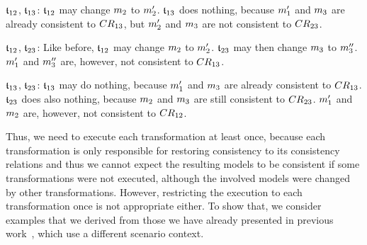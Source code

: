 \begin{properdescription}
    \item[$\transformation{t}_{12}$, $\transformation{t}_{13}$:] 
    $\transformation{t}_{12}$ may change $\model{m}{2}$ to $\model{m}{2}'$. $\transformation{t}_{13}$ does nothing, because $\model{m}{1}'$ and $\model{m}{3}$ are already consistent to $\consistencyrelation{CR}{13}$, but $\model{m}{2}'$ and $\model{m}{3}$ are not consistent to $\consistencyrelation{CR}{23}$.
    \item[$\transformation{t}_{12}$, $\transformation{t}_{23}$:] 
    Like before, $\transformation{t}_{12}$ may change $\model{m}{2}$ to $\model{m}{2}'$. 
    $\transformation{t}_{23}$ may then change $\model{m}{3}$ to $\model{m}{3}''$. 
    $\model{m}{1}'$ and $\model{m}{3}''$ are, however, not consistent to $\consistencyrelation{CR}{13}$.
    \item[$\transformation{t}_{13}$, $\transformation{t}_{23}$:]
    $\transformation{t}_{13}$ may do nothing, because $\model{m}{1}'$ and $\model{m}{3}$ are already consistent to $\consistencyrelation{CR}{13}$.
    $\transformation{t}_{23}$ does also nothing, because $\model{m}{2}$ and $\model{m}{3}$ are still consistent to $\consistencyrelation{CR}{23}$.
    $\model{m}{1}'$ and $\model{m}{2}$ are, however, not consistent to $\consistencyrelation{CR}{12}$.
\end{properdescription}

Thus, we need to execute each transformation at least once, because each transformation is only responsible for restoring consistency to its consistency relations and thus we cannot expect the resulting models to be consistent if some transformations were not executed, although the involved models were changed by other transformations.
However, restricting the execution to each transformation once is not appropriate either.
To show that, we consider examples that we derived from those we have already presented in previous work~, which use a different scenario context.

